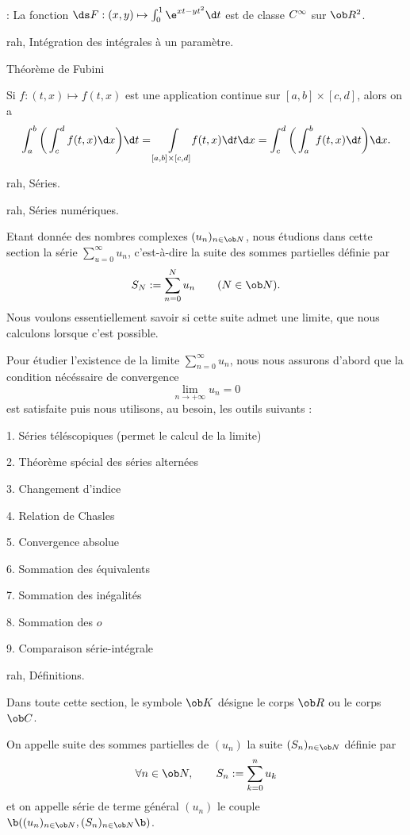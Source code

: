 \Application : La fonction $\ds F:(x,y)\mapsto\int_0^1\e^{xt-yt^2}\d t$ est de classe $\sc C^\infty$ sur $\ob R^2$. 
\bigskip



\Subsection rah, Intégration des intégrales à un paramètre. 
\medskip


\Concept Théorème de Fubini

\Theoreme [$a<b$ et $c<d$ dans $\ob R$] 
Si $f:(t,x)\mapsto f(t,x)$ est une application continue sur $[a,b]\times[c,d]$, alors on a 
$$
\int_a^b\bigg(\int_c^df(t,x)\d x\bigg)\d t=\int\limits_{[a,b]\times[c,d]}
\!\!f(t,x)\d t\d x=\int_c^d\bigg(\int_a^bf(t,x)\d t\bigg)\d x.
$$


%

\Chapter rah, Séries. 

\Section rah, Séries numériques. 

Etant donnée des nombres complexes $(u_n)_{n\in\ob N}$, nous étudions dans cette section la série $\sum_{u=0}^\infty u_n$, c'est-à-dire la suite des sommes partielles définie par  
$$
S_N:=\sum_{n=0}^Nu_n\qquad(N\in\ob N).
$$
Nous voulons essentiellement savoir si cette suite admet une limite, que  nous calculons lorsque c'est possible. 
\medskip

Pour étudier l'existence de la limite $\sum_{n=0}^\infty u_n$, nous nous assurons d'abord que  la condition nécéssaire de convergence   
$$
\lim_{n\to+\infty}u_n=0
$$
est satisfaite puis nous utilisons, au besoin, les outils suivants : 
\item{1.} Séries téléscopiques (permet le calcul de la limite)
\item{2.} Théorème spécial des séries alternées
\item{3.} Changement d'indice
\item{4.} Relation de Chasles
\item{5.} Convergence absolue
\item{6.} Sommation des équivalents
\item{7.} Sommation des inégalités
\item{8.} Sommation des $o$
\item{9.} Comparaison série-intégrale

\Subsection rah, Définitions. 

Dans toute cette section, le symbole $\ob K$ désigne le corps $\ob R$ ou le corps $\ob C$. 
\bigskip

On appelle suite des sommes partielles de $(u_n)$ la suite $(S_n)_{n\in\ob N}$ définie par 
$$
\forall n\in\ob N, \qquad S_n:=\sum_{k=0}^nu_k
$$ 
et on appelle série de terme général $(u_n)$ le couple $\b((u_n)_{n\in\ob N},(S_n)_{n\in\ob N}\b)$. 
\bigskip

